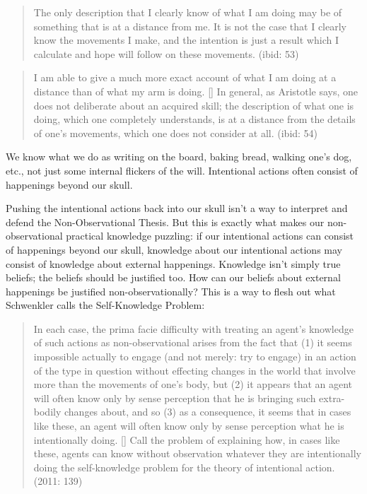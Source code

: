 \documentclass[a4paper,12pt]{article}
\begin{document}
\begin{quote}
The only description that I clearly know of what I am doing may be of something that is at a distance from me. It is not the case that I clearly know the movements I make, and the intention is just a result which I calculate and hope will follow on these movements. (ibid: 53)
\end{quote}

\begin{quote}
I am able to give a much more exact account of what I am doing at a distance than of what my arm is doing. [\textellipsis] In general, as Aristotle says, one does not deliberate about an acquired skill; the description of what one is doing, which one completely understands, is at a distance from the details of one's movements, which one does not consider at all. (ibid: 54)
\end{quote}

We know what we do as writing on the board, baking bread, walking one's dog, etc., not just some internal flickers of the will. Intentional actions often consist of happenings beyond our skull.

Pushing the intentional actions back into our skull isn't a way to interpret and defend the Non-Observational Thesis. But this is exactly what makes our non-observational practical knowledge puzzling: if our intentional actions can consist of happenings beyond our skull, knowledge about our intentional actions may consist of knowledge about external happenings. Knowledge isn't simply true beliefs; the beliefs should be justified too. How can our beliefs about external happenings be justified non-observationally? This is a way to flesh out what Schwenkler calls the Self-Knowledge Problem:

\begin{quote}
In each case, the prima facie difficulty with treating an agent's knowledge of such actions as non-observational arises from the fact that (1) it seems impossible actually to engage (and not merely: try to engage) in an action of the type in question without effecting changes in the world that involve more than the movements of one's body, but (2) it appears that an agent will often know only by sense perception that he is bringing such extra-bodily changes about, and so (3) as a consequence, it seems that in cases like these, an agent will often know only by sense perception what he is intentionally doing. [\textellipsis] Call the problem of explaining how, in cases like these, agents can know without observation whatever they are intentionally doing the self-knowledge problem for the theory of intentional action. (2011: 139)
\end{quote}
\end{document}
